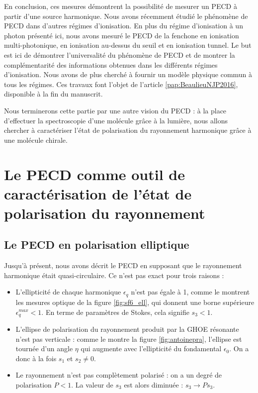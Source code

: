 En conclusion, ces mesures démontrent la possibilité de mesurer un PECD à partir d'une source harmonique. Nous avons récemment étudié le phénomène de PECD dans d'autres régimes d'ionisation. En plus du régime d'ionisation à un photon présenté ici, nous avons mesuré le PECD de la fenchone en ionisation multi-photonique, en ionisation au-dessus du seuil et en ionisation tunnel. Le but est ici de démontrer l'universalité du phénomène de PECD et de montrer la complémentarité des informations obtenues dans les différents régimes d'ionisation. Nous avons de plus cherché à fournir un modèle physique commun à tous les régimes. Ces travaux font l'objet de l'article \ref{pap:BeaulieuNJP2016}, disponible à la fin du manuscrit.

Nous terminerons cette partie par une autre vision du PECD : à la place d'effectuer la spectroscopie d'une molécule grâce à la lumière, nous allons chercher à caractériser l'état de polarisation du rayonnement harmonique grâce à une molécule chirale.

\chapter{Le PECD comme outil de caractérisation de l'état de polarisation du rayonnement}
\section{Le PECD en polarisation elliptique}
Jusqu'à présent, nous avons décrit le PECD en supposant que le rayonnement harmonique était quasi-circulaire. Ce n'est pas exact pour trois raisons :

\begin{itemize}
\renewcommand{\labelitemi}{$\bullet$}
\setlength\itemsep{1em}
\item L'ellipticité de chaque harmonique $\epsilon_q$ n'est pas égale à 1, comme le montrent les mesures optique de la figure \ref{fig:sf6_ell}, qui donnent une borne supérieure $\epsilon_q^{max}<1$. En terme de paramètres de Stokes, cela signifie $s_3<1$.
\item L'ellipse de polarisation du rayonnement produit par la GHOE résonante n'est pas verticale : comme le montre la figure \ref{fig:antoinepra}, l'ellipse est tournée d'un angle $\eta$ qui augmente avec l'ellipticité du fondamental $\epsilon_0$. On a donc à la fois $s_1$ et $s_2\neq 0$.
\item Le rayonnement n'est pas complètement polarisé : on a un degré de polarisation $P<1$. La valeur de $s_3$ est alors diminuée : $s_3 \rightarrow Ps_3$.
\end{itemize}


